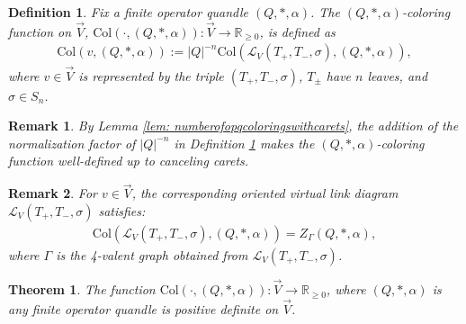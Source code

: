 \documentclass[10pt,a4paper]{amsart}
\newtheorem{definition}{Definition}
\newtheorem{remark}{Remark}
\newtheorem{theorem}{Theorem}
\begin{document}
\begin{definition}\label{def: oq-positive-type}
    Fix a finite operator quandle $(Q,*,\alpha)$. The $(Q,*,\alpha)$-\textit{coloring function} on $\vec{V}$, $\text{Col}(\cdot, (Q,*,\alpha)):\vec{V}\to \mathbb{R}_{\geq 0}$, is defined as
    \begin{align*}
        \text{Col}(v, (Q,*,\alpha)) := |Q|^{-n}\text{Col}(\mathscr{L}_{V}(T_+, T_-,\sigma), (Q,*,\alpha)),
    \end{align*}
    where $v \in \vec{V}$ is represented by the triple $(T_+, T_-,\sigma)$, $T_{\pm}$ have $n$ leaves, and $\sigma\in S_n$. 
\end{definition}

\begin{remark}\label{rmk: well-defined-positive-function}
    By Lemma \ref{lem: numberofopqcoloringswithcarets}, the addition of the normalization factor of $|Q|^{-n}$ in Definition \ref{def: oq-positive-type} makes the $(Q,*,\alpha)$-coloring function well-defined up to canceling carets. 
\end{remark}

\begin{remark}\label{rem: opq_colorings_is_Z}
    For $v \in \vec{V}$, the corresponding oriented virtual link diagram $\mathscr{L}_V(T_+,T_-,\sigma)$ satisfies: 
    \begin{align*}
        \text{Col}(\mathscr{L}_{V}(T_+,T_-,\sigma),(Q,*,\alpha))=Z_\Gamma(Q,*,\alpha),
    \end{align*}
    where $\Gamma$ is the 4-valent graph obtained from $\mathscr{L}_{V}(T_+,T_-,\sigma)$. 
\end{remark}

\begin{theorem}\label{thm: function_of_positive_type_oriented}
    The function $\text{Col}(\cdot,(Q,*,
\alpha)):\vec{V}\to \mathbb{R}_{\geq 0}$, where $(Q,*,\alpha)$ is any finite operator quandle is positive definite on $\vec{V}$.
\end{theorem}
\end{document}
